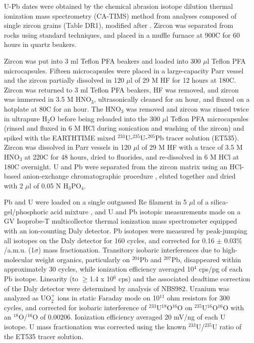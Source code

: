 \documentclass[11pt,letterpaper]{article}
\begin{document}
U-Pb dates were obtained by the chemical abrasion isotope dilution thermal ionization mass spectrometry (CA-TIMS) method from analyses composed of single zircon grains (Table DR1), modified after \cite{Mattinson2005a}. Zircon was separated from rocks using standard techniques, and placed in a muffle furnace at 900\textdegree C for 60 hours in quartz beakers. 

Zircon was put into 3 ml Teflon PFA beakers and loaded into 300 $\mu$l Teflon PFA microcapsules. Fifteen microcapsules were placed in a large-capacity Parr vessel and the zircon partially dissolved in 120 $\mu$l of 29 M HF for 12 hours at 180\textdegree C. Zircon was returned to 3 ml Teflon PFA beakers, HF was removed, and zircon was immersed in 3.5 M HNO$_\mathrm{3}$, ultrasonically cleaned for an hour, and fluxed on a hotplate at 80\textdegree C for an hour. The HNO$_\mathrm{3}$ was removed and zircon was rinsed twice in ultrapure H$_\mathrm{2}$O before being reloaded into the 300 $\mu$l Teflon PFA microcapsules (rinsed and fluxed in 6 M HCl during sonication and washing of the zircon) and spiked with the EARTHTIME mixed $^{233}$U-$^{235}$U-$^{205}$Pb tracer solution (ET535). Zircon was dissolved in Parr vessels in 120 $\mu$l of 29 M HF with a trace of 3.5 M HNO$_\mathrm{3}$ at 220\textdegree C for 48 hours, dried to fluorides, and re-dissolved in 6 M HCl at 180\textdegree C overnight. U and Pb were separated from the zircon matrix using an HCl-based anion-exchange chromatographic procedure \citep{Krogh1973a}, eluted together and dried with 2 $\mu$l of 0.05 N H$_\mathrm{3}$PO$_\mathrm{4}$.

Pb and U were loaded on a single outgassed Re filament in 5 $\mu$l of a silica-gel/phosphoric acid mixture \citep{Gerstenberger1997a}, and U and Pb isotopic measurements made on a GV Isoprobe-T multicollector thermal ionization mass spectrometer equipped with an ion-counting Daly detector. Pb isotopes were measured by peak-jumping all isotopes on the Daly detector for 160 cycles, and corrected for 0.16 $\pm$ 0.03$\%$/a.m.u. (1$\sigma$) mass fractionation. Transitory isobaric interferences due to high-molecular weight organics, particularly on $^{204}$Pb and $^{207}$Pb, disappeared within approximately 30 cycles, while ionization efficiency averaged 10$^4$ cps/pg of each Pb isotope. Linearity (to $\geq$1.4 x 10$^6$ cps) and the associated deadtime correction of the Daly detector were determined by analysis of NBS982. Uranium was analyzed as UO$_2^+$ ions in static Faraday mode on 10$^{11}$ ohm resistors for 300 cycles, and corrected for isobaric interference of $^{233}$U$^{18}$O$^{16}$O on $^{235}$U$^{16}$O$^{16}$O with an $^{18}$O/$^{16}$O of 0.00206. Ionization efficiency averaged 20 mV/ng of each U isotope. U mass fractionation was corrected using the known $^{233}$U/$^{235}$U ratio of the ET535 tracer solution. 
\end{document}
